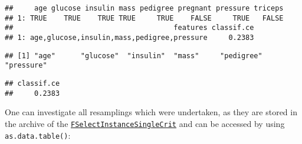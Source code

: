 \documentclass[
]{scrbook}
\newenvironment{Shaded}{\begin{snugshade}}{\end{snugshade}}
\newcommand{\CommentTok}[1]{\textcolor[rgb]{0.56,0.35,0.01}{\textit{#1}}}
\newcommand{\FunctionTok}[1]{\textcolor[rgb]{0.00,0.00,0.00}{#1}}
\newcommand{\NormalTok}[1]{#1}
\newcommand{\SpecialCharTok}[1]{\textcolor[rgb]{0.00,0.00,0.00}{#1}}
\newcommand{\StringTok}[1]{\textcolor[rgb]{0.31,0.60,0.02}{#1}}
\renewenvironment{Shaded} {\begin{snugshade}\small} {\end{snugshade}}
\begin{document}
\begin{Shaded}
\end{Shaded}

\begin{verbatim}
##     age glucose insulin mass pedigree pregnant pressure triceps
## 1: TRUE    TRUE    TRUE TRUE     TRUE    FALSE     TRUE   FALSE
##                                      features classif.ce
## 1: age,glucose,insulin,mass,pedigree,pressure     0.2383
\end{verbatim}

\begin{Shaded}
\end{Shaded}

\begin{verbatim}
## [1] "age"      "glucose"  "insulin"  "mass"     "pedigree" "pressure"
\end{verbatim}

\begin{Shaded}
\end{Shaded}

\begin{verbatim}
## classif.ce 
##     0.2383
\end{verbatim}

One can investigate all resamplings which were undertaken, as they are stored in the archive of the \href{https://mlr3fselect.mlr-org.com/reference/FSelectInstanceSingleCrit.html}{\texttt{FSelectInstanceSingleCrit}} and can be accessed by using \texttt{as.data.table()}:

\begin{Shaded}
\end{Shaded}
\end{document}
